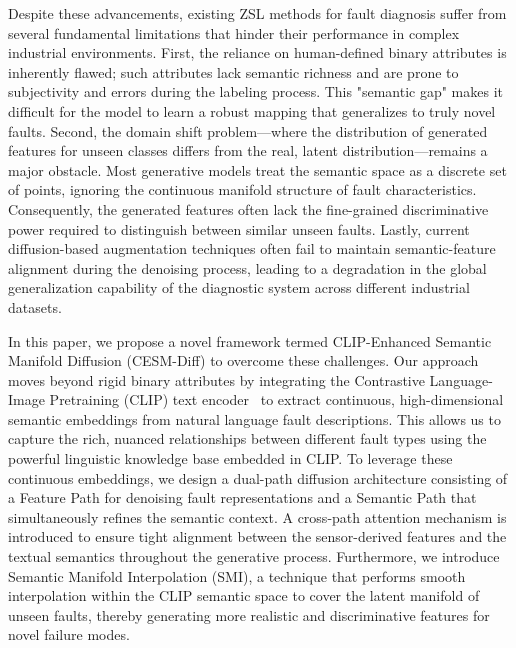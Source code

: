 Despite these advancements, existing ZSL methods for fault diagnosis suffer from several fundamental limitations that hinder their performance in complex industrial environments. First, the reliance on human-defined binary attributes is inherently flawed; such attributes lack semantic richness and are prone to subjectivity and errors during the labeling process. This "semantic gap" makes it difficult for the model to learn a robust mapping that generalizes to truly novel faults. Second, the domain shift problem—where the distribution of generated features for unseen classes differs from the real, latent distribution—remains a major obstacle. Most generative models treat the semantic space as a discrete set of points, ignoring the continuous manifold structure of fault characteristics. Consequently, the generated features often lack the fine-grained discriminative power required to distinguish between similar unseen faults. Lastly, current diffusion-based augmentation techniques often fail to maintain semantic-feature alignment during the denoising process, leading to a degradation in the global generalization capability of the diagnostic system across different industrial datasets.

In this paper, we propose a novel framework termed CLIP-Enhanced Semantic Manifold Diffusion (CESM-Diff) to overcome these challenges. Our approach moves beyond rigid binary attributes by integrating the Contrastive Language-Image Pretraining (CLIP) text encoder~\cite{radford2021learning} to extract continuous, high-dimensional semantic embeddings from natural language fault descriptions. This allows us to capture the rich, nuanced relationships between different fault types using the powerful linguistic knowledge base embedded in CLIP. To leverage these continuous embeddings, we design a dual-path diffusion architecture consisting of a Feature Path for denoising fault representations and a Semantic Path that simultaneously refines the semantic context. A cross-path attention mechanism is introduced to ensure tight alignment between the sensor-derived features and the textual semantics throughout the generative process. Furthermore, we introduce Semantic Manifold Interpolation (SMI), a technique that performs smooth interpolation within the CLIP semantic space to cover the latent manifold of unseen faults, thereby generating more realistic and discriminative features for novel failure modes.

